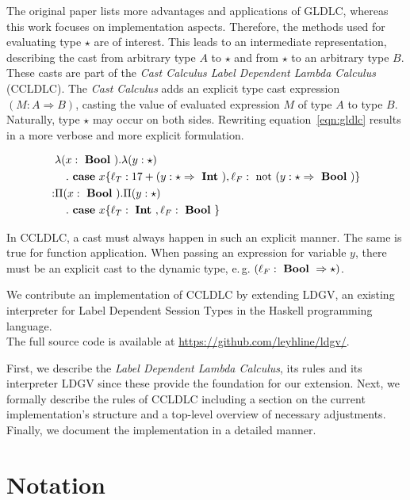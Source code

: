 The original paper lists more advantages and applications of GLDLC, whereas this work focuses on implementation aspects. Therefore, the methods used for evaluating type $\star$ are of interest. This leads to an intermediate representation, describing the cast from arbitrary type $A$ to $\star$ and from $\star$ to an arbitrary type $B$. These casts are part of the \emph{Cast Calculus Label Dependent Lambda Calculus} (CCLDLC). The \emph{Cast Calculus} adds an explicit type cast expression $(M : A \Rightarrow B)$, casting the value of evaluated expression $M$ of type $A$ to type $B$. Naturally, type $\star$ may occur on both sides. Rewriting equation~\ref{eqn:gldlc} results in a more verbose and more explicit formulation.

\begin{equation}\label{eqn:ccldlc}
\begin{split}
&\lambda (x: \text{ \textbf{Bool} }) . \lambda (y: \star ) \\
&\quad . \text{ \textbf{case} } x \{\ell_T: 17+(y:\star \Rightarrow \text{ \textbf{Int} }),\ell_F: \text{ not } (y:\star \Rightarrow \text{ \textbf{Bool} })\} \\
: & \Pi(x : \text{ \textbf{Bool} }) . \Pi (y: \star ) \\
&\quad . \text{ \textbf{case} } x \{\ell_T: \text{ \textbf{Int} }, \ell_F: \text{ \textbf{Bool} } \}
\end{split}
\end{equation}

In CCLDLC, a cast must always happen in such an explicit manner. The same is true for function application. When passing an expression for variable $y$, there must be an explicit cast to the dynamic type, e.\,g. $(\ell_F : \text{ \textbf{Bool} } \Rightarrow \star)$.

We contribute an implementation of CCLDLC by extending LDGV, an existing interpreter for Label Dependent Session Types in the Haskell programming language.
\\
The full source code is available at \url{https://github.com/leyhline/ldgv/}.

First, we describe the \emph{Label Dependent Lambda Calculus}, its rules and its interpreter LDGV since these provide the foundation for our extension. Next, we formally describe the rules of CCLDLC including a section on the current implementation's structure and a top-level overview of necessary adjustments. Finally, we document the implementation in a detailed manner.

\section{Notation}

